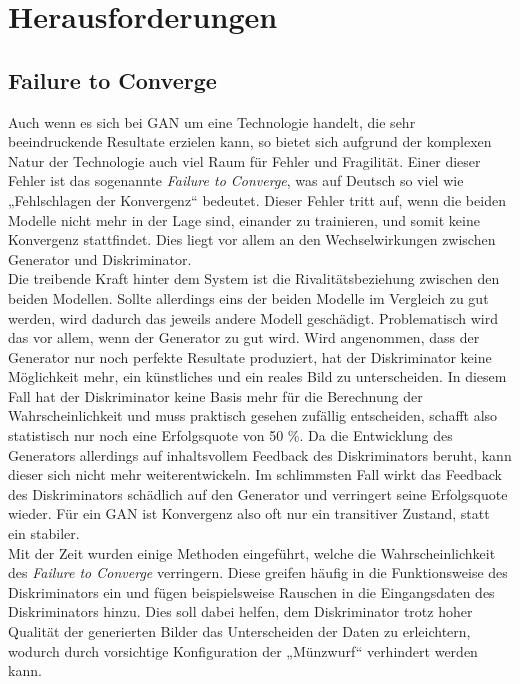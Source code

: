 \chapter{Herausforderungen}

\section{Failure to Converge}
\label{chap:FTC}

\noindent Auch wenn es sich bei \ac{GAN} um eine Technologie handelt, die sehr beeindruckende Resultate erzielen kann, so bietet sich aufgrund der komplexen Natur der Technologie auch viel Raum für Fehler und Fragilität. Einer dieser Fehler ist das sogenannte \textit{Failure to Converge}, was auf Deutsch so viel wie „Fehlschlagen der Konvergenz“ bedeutet. Dieser Fehler tritt auf, wenn die beiden Modelle nicht mehr in der Lage sind, einander zu trainieren, und somit keine Konvergenz stattfindet. Dies liegt vor allem an den Wechselwirkungen zwischen Generator und Diskriminator. \\

\noindent Die treibende Kraft hinter dem System ist die Rivalitätsbeziehung zwischen den beiden Modellen. Sollte allerdings eins der beiden Modelle im Vergleich zu gut werden, wird dadurch das jeweils andere Modell geschädigt. Problematisch wird das vor allem, wenn der Generator zu gut wird. Wird angenommen, dass der Generator nur noch perfekte Resultate produziert, hat der Diskriminator keine Möglichkeit mehr, ein künstliches und ein reales Bild zu unterscheiden. In diesem Fall hat der Diskriminator keine Basis mehr für die Berechnung der Wahrscheinlichkeit und muss praktisch gesehen zufällig entscheiden, schafft also statistisch nur noch eine Erfolgsquote von 50 \%. Da die Entwicklung des Generators allerdings auf inhaltsvollem Feedback des Diskriminators beruht, kann dieser sich nicht mehr weiterentwickeln. Im schlimmsten Fall wirkt das Feedback des Diskriminators schädlich auf den Generator und verringert seine Erfolgsquote wieder. Für ein \ac{GAN} ist Konvergenz also oft nur ein transitiver Zustand, statt ein stabiler.\\

\noindent Mit der Zeit wurden einige Methoden eingeführt, welche die Wahrscheinlichkeit des \textit{Failure to Converge} verringern. Diese greifen häufig in die Funktionsweise des Diskriminators ein und fügen beispielsweise Rauschen in die Eingangsdaten des Diskriminators hinzu. Dies soll dabei helfen, dem Diskriminator trotz hoher Qualität der generierten Bilder das Unterscheiden der Daten zu erleichtern, wodurch durch vorsichtige Konfiguration der „Münzwurf“ verhindert werden kann.\cite{training} \\